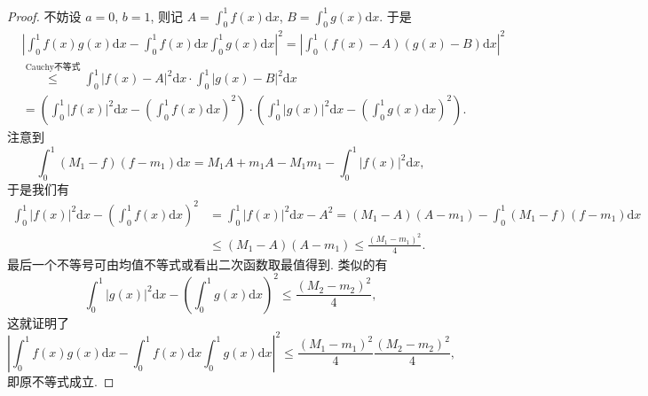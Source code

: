 \documentclass[../../main.tex]{subfiles}%
\begin{document}
\begin{proof}
不妨设 $a = 0$, $b = 1$, 则记 $A = \int_{0}^{1}f(x)\mathrm{d}x$, $B = \int_{0}^{1}g(x)\mathrm{d}x$. 于是
\begin{align*}
&\left|\int_{0}^{1}f(x)g(x)\mathrm{d}x - \int_{0}^{1}f(x)\mathrm{d}x\int_{0}^{1}g(x)\mathrm{d}x\right|^2 = \left|\int_{0}^{1}(f(x) - A)(g(x) - B)\mathrm{d}x\right|^2
\\
&\stackrel{\hyperref[theorem:Cauchy积分不等式]{\text{Cauchy不等式}}}{\leqslant } \int_{0}^{1}|f(x) - A|^2\mathrm{d}x \cdot \int_{0}^{1}|g(x) - B|^2\mathrm{d}x
\\
&= \left(\int_{0}^{1}|f(x)|^2\mathrm{d}x - \left(\int_{0}^{1}f(x)\mathrm{d}x\right)^2\right) \cdot \left(\int_{0}^{1}|g(x)|^2\mathrm{d}x - \left(\int_{0}^{1}g(x)\mathrm{d}x\right)^2\right).
\end{align*}
注意到
\[
\int_{0}^{1}(M_1 - f)(f - m_1)\mathrm{d}x = M_1A + m_1A - M_1m_1 - \int_{0}^{1}|f(x)|^2\mathrm{d}x,
\]
于是我们有
\begin{align*}
\int_{0}^{1}|f(x)|^2\mathrm{d}x - \left(\int_{0}^{1}f(x)\mathrm{d}x\right)^2 &=\int_{0}^{1}|f(x)|^2\mathrm{d}x -A^2
= (M_1 - A)(A - m_1) - \int_{0}^{1}(M_1 - f)(f - m_1)\mathrm{d}x\\
&\leqslant  (M_1-A)(A-m_1)\leqslant  \frac{(M_1-m_1)^2}{4}.
\end{align*}
最后一个不等号可由均值不等式或看出二次函数取最值得到.
类似的有
\[
\int_{0}^{1}|g(x)|^2\mathrm{d}x - \left(\int_{0}^{1}g(x)\mathrm{d}x\right)^2 \leqslant  \frac{(M_2 - m_2)^2}{4},
\]
这就证明了
\[
\left|\int_{0}^{1}f(x)g(x)\mathrm{d}x - \int_{0}^{1}f(x)\mathrm{d}x\int_{0}^{1}g(x)\mathrm{d}x\right|^2 \leqslant  \frac{(M_1 - m_1)^2}{4}\frac{(M_2 - m_2)^2}{4},
\]
即原不等式成立. 
\end{proof}
\end{document}
